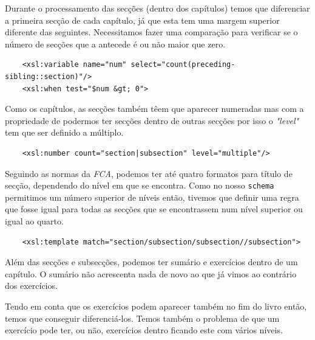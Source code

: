 \documentclass[a4paper]{article}
\begin{document}
\hspace{1cm}Durante o processamento das secções (dentro dos capítulos) temos que diferenciar a primeira secção de cada capítulo, já que esta tem uma margem superior diferente das seguintes. Necessitamos fazer uma comparação para verificar se o número de secções que a antecede é ou não maior que zero.\\

\begin{small}
\begin{lstlisting}
    <xsl:variable name="num" select="count(preceding-sibling::section)"/>
    <xsl:when test="$num &gt; 0">
\end{lstlisting}
\end{small}
    
\hspace{1cm}Como os capítulos, as secções também têem que aparecer numeradas mas com a propriedade de podermos ter secções dentro de outras secções por isso o {\em "level"} tem que ser definido a múltiplo.\\

\begin{small}
\begin{lstlisting}
    <xsl:number count="section|subsection" level="multiple"/>
\end{lstlisting}
\end{small}

\hspace{1cm}Seguindo as normas da {\em FCA}, podemos ter até quatro formatos para título de secção, dependendo do nível em que se encontra. Como no nosso \verb|schema| permitimos um número superior de níveis então, tivemos que definir uma regra que fosse igual para todas as secções que se encontrassem num nível superior ou igual ao quarto.\\

\begin{small}
\begin{lstlisting}
    <xsl:template match="section/subsection/subsection//subsection">
\end{lstlisting}
\end{small}
  
\hspace{1cm}Além das secções e subsecções, podemos ter sumário e exercícios dentro de um capítulo. O sumário não acrescenta nada de novo ao que já vimos ao contrário dos exercícios.

\hspace{1cm}Tendo em conta que os exercícios podem aparecer também no fim do livro então, temos que conseguir diferenciá-los. Temos também o problema de que um exercício pode ter, ou não, exercícios dentro ficando este com vários níveis.
\end{document}
